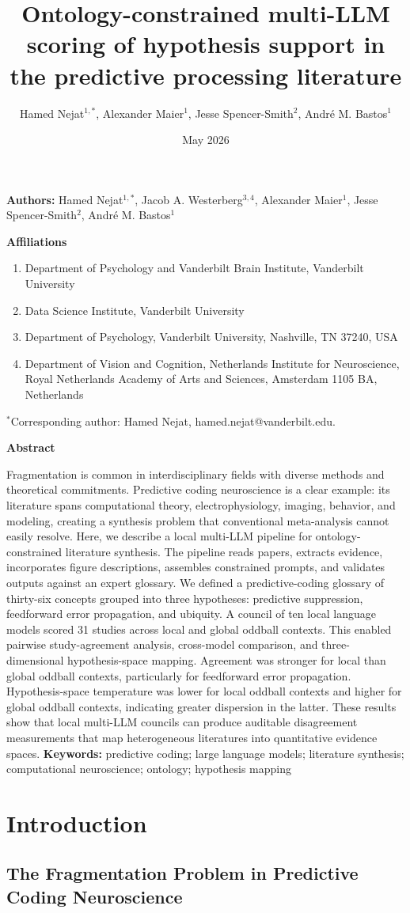 \documentclass[12pt]{article}
\title{Ontology-constrained multi-LLM scoring of hypothesis support in the predictive processing literature}
\author{Hamed Nejat$^{1,*}$, \DIFaddbegin \DIFadd{Jacob A. Westerberg$^{3,4}$, }\DIFaddend Alexander Maier$^{1}$, Jesse Spencer-Smith$^{2}$, Andr\'e M. Bastos$^{1}$}
\date{May 2026}
\makeatletter
\renewcommand{\maketitle}{%
  \begin{flushleft}
  {\large\bfseries \@title\par}
  \vspace{0.9em}
  {\normalsize\textbf{Authors:} Hamed Nejat$^{1,*}$, Jacob A. Westerberg$^{3,4}$, Alexander Maier$^{1}$, Jesse Spencer-Smith$^{2}$, Andr\'e M. Bastos$^{1}$\par} %
  \vspace{0.9em}
  {\normalsize\bfseries Affiliations\par}
  \vspace{0.5em}
  \begin{enumerate}[leftmargin=0.75in,label=\arabic*.]
  \item Department of Psychology and Vanderbilt Brain Institute, Vanderbilt University
  \item Data Science Institute, Vanderbilt University
  \item Department of Psychology, Vanderbilt University, Nashville, TN 37240, USA %
  \item Department of Vision and Cognition, Netherlands Institute for Neuroscience, Royal Netherlands Academy of Arts and Sciences, Amsterdam 1105 BA, Netherlands %
  \end{enumerate}
  \vspace{0.3em}
  {\normalsize $^*$Corresponding author: Hamed Nejat, hamed.nejat@vanderbilt.edu.\par}
  \end{flushleft}
  \vspace{0.4em}
}
\makeatother
\begin{document}
\pagestyle{plain}
\maketitle
\linenumbers

\noindent\textbf{Abstract}\par
Fragmentation is common in interdisciplinary fields with diverse methods and theoretical commitments. Predictive coding neuroscience is a clear example: its literature spans computational theory, electrophysiology, imaging, behavior, and modeling, creating a synthesis problem that conventional meta-analysis cannot easily resolve. Here, we describe a local multi-LLM pipeline for ontology-constrained literature synthesis. The pipeline reads papers, extracts evidence, incorporates figure descriptions, assembles constrained prompts, and validates outputs against an expert glossary. We defined a predictive-coding glossary of thirty-six concepts grouped into three hypotheses: predictive suppression, feedforward error propagation, and ubiquity. A council of ten local language models scored 31 studies across local and global oddball contexts. This enabled pairwise study-agreement analysis, cross-model comparison, and three-dimensional hypothesis-space mapping. Agreement was stronger for local than global oddball contexts, particularly for feedforward error propagation. Hypothesis-space temperature was lower for local oddball contexts and higher for global oddball contexts, indicating greater dispersion in the latter. These results show that local multi-LLM councils can produce auditable disagreement measurements that map heterogeneous literatures into quantitative evidence spaces.
\vspace{0.8em}
\noindent\textbf{Keywords:} predictive coding; large language models; literature synthesis; computational neuroscience; ontology; hypothesis mapping

\section{Introduction}\label{introduction}

\subsection{The Fragmentation Problem in Predictive Coding Neuroscience}\label{the-fragmentation-problem-in-predictive-coding-neuroscience}
\end{document}
